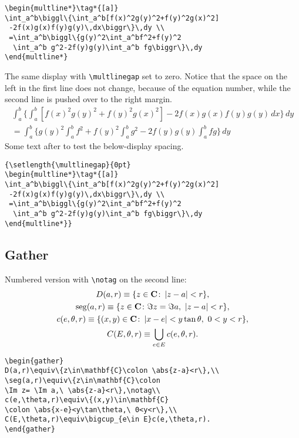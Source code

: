 \documentclass[mlq,fleqn]{w-art}
\DeclareMathOperator{\seg}{seg}
\newcommand{\envert}[1]{\left\lvert#1\right\rvert}
\let\abs=\envert
\begin{document}
\begin{verbatim}
\begin{multline*}\tag*{[a]}
\int_a^b\biggl\{\int_a^b[f(x)^2g(y)^2+f(y)^2g(x)^2]
 -2f(x)g(x)f(y)g(y)\,dx\biggr\}\,dy \\
 =\int_a^b\biggl\{g(y)^2\int_a^bf^2+f(y)^2
  \int_a^b g^2-2f(y)g(y)\int_a^b fg\biggr\}\,dy
\end{multline*}
\end{verbatim}


The same display with \verb=\multlinegap= set to zero.
Notice that the space on the left in
the first line does not change, because of the equation number, while
the second line is pushed over to the right margin.
{\setlength{\multlinegap}{0pt}
\begin{multline*}\tag*{[a]}
\int_a^b\biggl\{\int_a^b[f(x)^2g(y)^2+f(y)^2g(x)^2]
 -2f(x)g(x)f(y)g(y)\,dx\biggr\}\,dy \\
 =\int_a^b\biggl\{g(y)^2\int_a^bf^2+f(y)^2
  \int_a^b g^2-2f(y)g(y)\int_a^b fg\biggr\}\,dy
\end{multline*}}%
Some text after to test the below-display spacing.

\begin{verbatim}
{\setlength{\multlinegap}{0pt}
\begin{multline*}\tag*{[a]}
\int_a^b\biggl\{\int_a^b[f(x)^2g(y)^2+f(y)^2g(x)^2]
 -2f(x)g(x)f(y)g(y)\,dx\biggr\}\,dy \\
 =\int_a^b\biggl\{g(y)^2\int_a^bf^2+f(y)^2
  \int_a^b g^2-2f(y)g(y)\int_a^b fg\biggr\}\,dy
\end{multline*}}
\end{verbatim}
\fi %


\newpage
\subsection{Gather}
Numbered version with \verb;\notag; on the second line:
\begin{gather}
D(a,r)\equiv\{z\in\mathbf{C}\colon \abs{z-a}<r\},\\
\seg(a,r)\equiv\{z\in\mathbf{C}\colon
\Im z= \Im a,\ \abs{z-a}<r\},\notag\\
c(e,\theta,r)\equiv\{(x,y)\in\mathbf{C}
\colon \abs{x-e}<y\tan\theta,\ 0<y<r\},\\
C(E,\theta,r)\equiv\bigcup_{e\in E}c(e,\theta,r).
\end{gather}
\begin{verbatim}
\begin{gather}
D(a,r)\equiv\{z\in\mathbf{C}\colon \abs{z-a}<r\},\\
\seg(a,r)\equiv\{z\in\mathbf{C}\colon
\Im z= \Im a,\ \abs{z-a}<r\},\notag\\
c(e,\theta,r)\equiv\{(x,y)\in\mathbf{C}
\colon \abs{x-e}<y\tan\theta,\ 0<y<r\},\\
C(E,\theta,r)\equiv\bigcup_{e\in E}c(e,\theta,r).
\end{gather}
\end{verbatim}
\end{document}
